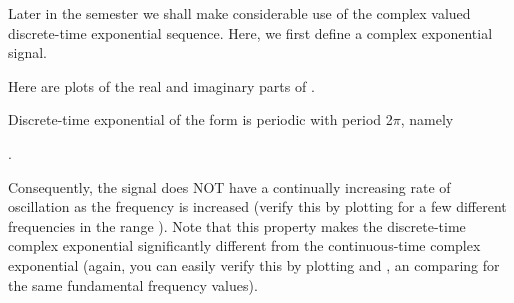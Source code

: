 \documentclass{article}
\begin{document}
\begin{CellGroup}
\begin{CellGroup}
\begin{CellGroup}
\end{CellGroup}
Later in the semester we shall make considerable use of the complex valued  discrete-time exponential sequence. Here, we first define a complex exponential
signal.

 Here are plots of the real and imaginary parts of . 



\begin{CellGroup}

\end{CellGroup}

\end{CellGroup}
\begin{CellGroup}
Discrete-time exponential of the form  is periodic with period 2\(\pi
\), namely



.

\begin{CellGroup}

\end{CellGroup}
Consequently, the signal  does NOT have a continually
increasing rate of oscillation as the  frequency is increased (verify this by plotting  for a
few different frequencies in the range ). Note that this property makes the discrete-time
complex exponential significantly different from the continuous-time complex exponential (again, you can easily verify this by plotting 
and , an comparing for the same fundamental frequency values).


\end{CellGroup}
\end{CellGroup}
\end{document}
